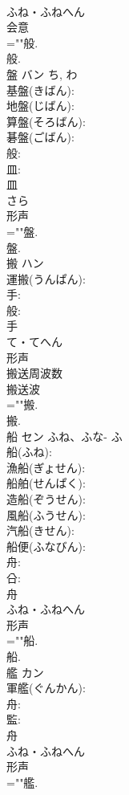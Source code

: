\documentclass[8pt]{extreport}
\begin{document}
\begin{CJK}{UTF8}{min}
\\	ふね・ふねへん	
\\	会意 
\\	=""般.
\\	般.
\\	盤	バン		ち, わ	
\\	基盤(きばん): 
\\	地盤(じばん): 
\\	算盤(そろばん): 
\\	碁盤(ごばん): 
\\	般: 
\\	皿: 
\\	皿	
\\	さら	
\\	形声 
\\	=""盤.
\\	盤.
\\	搬	ハン			
\\	運搬(うんぱん): 
\\	手: 
\\	般: 
\\	手	
\\	て・てへん	
\\	形声 
\\	搬送周波数 
\\	搬送波 
\\	=""搬.
\\	搬.
\\	船	セン	ふね、ふな-	ふ	
\\	船(ふね): 
\\	漁船(ぎょせん): 
\\	船舶(せんぱく): 
\\	造船(ぞうせん): 
\\	風船(ふうせん): 
\\	汽船(きせん): 
\\	船便(ふなびん): 
\\	舟: 
\\	㕣: 
\\	舟	
\\	ふね・ふねへん	
\\	形声 
\\	=""船.
\\	船.
\\	艦	カン			
\\	軍艦(ぐんかん): 
\\	舟: 
\\	監: 
\\	舟	
\\	ふね・ふねへん	
\\	形声 
\\	=""艦.

\end{CJK}
\end{document}

